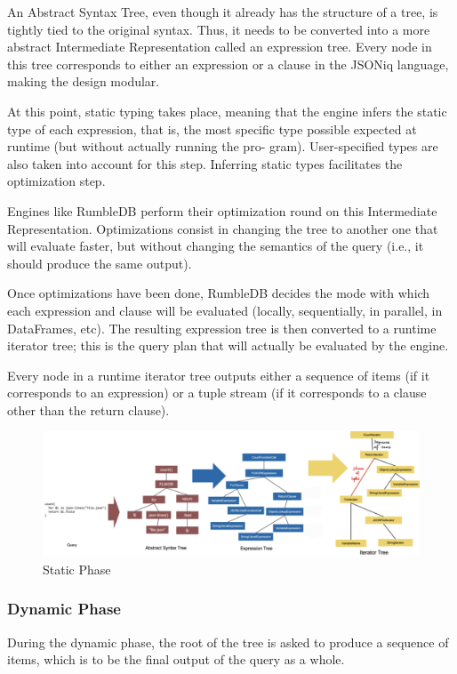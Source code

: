 An Abstract Syntax Tree, even though it already has the structure of a tree, is tightly tied to the original syntax. Thus, it needs to be converted into a more abstract Intermediate Representation called an expression tree. Every node in this tree corresponds to either an expression or a clause in the JSONiq language, making the design modular.

At this point, static typing takes place, meaning that the engine infers the static type of each expression, that is, the most specific type possible expected at runtime (but without actually running the pro- gram). User-specified types are also taken into account for this step. Inferring static types facilitates the optimization step.

Engines like RumbleDB perform their optimization round on this Intermediate Representation. Optimizations consist in changing the tree to another one that will evaluate faster, but without changing the semantics of the query (i.e., it should produce the same output).

Once optimizations have been done, RumbleDB decides the mode with which each expression and clause will be evaluated (locally, sequentially, in parallel, in DataFrames, etc). The resulting expression tree is then converted to a runtime iterator tree; this is the query plan that will actually be evaluated by the engine.

Every node in a runtime iterator tree outputs either a sequence of items (if it corresponds to an expression) or a tuple stream (if it corresponds to a clause other than the return clause).

\begin{figure}[h]
    \centering
    \includegraphics[width=\textwidth]{Figures/StaticPhase.png}
    \caption{Static Phase}
\end{figure}

\subsubsection{Dynamic Phase}
During the dynamic phase, the root of the tree is asked to produce a sequence of items, which is to be the final output of the query as a whole.

